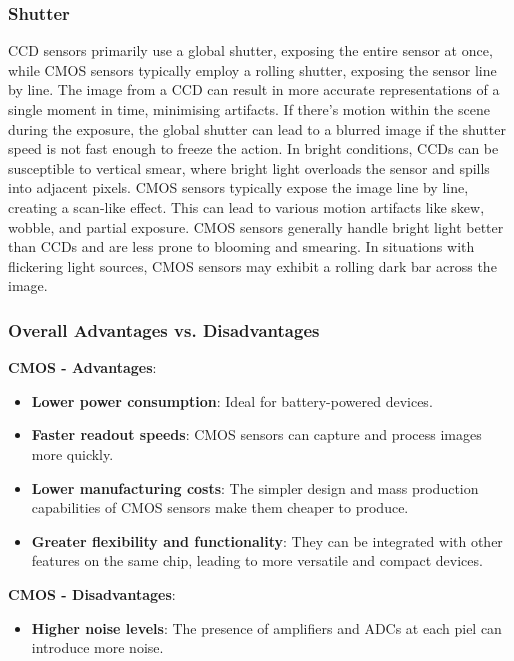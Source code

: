 \subsubsection{Shutter}
CCD sensors primarily use a global shutter, exposing the entire sensor at once, while CMOS sensors typically employ a rolling shutter, exposing the sensor line by line.
\nl
The image from a CCD can result in more accurate representations of a single moment in time, minimising artifacts. If there's motion within the scene during the exposure, the global shutter can lead to a blurred image if the shutter speed is not fast enough to freeze the action.
In bright conditions, CCDs can be susceptible to vertical smear, where bright light overloads the sensor and spills into adjacent pixels.
\nl
CMOS sensors typically expose the image line by line, creating a scan-like effect. This can lead to various motion artifacts like skew, wobble, and partial exposure.
CMOS sensors generally handle bright light better than CCDs and are less prone to blooming and smearing. In situations with flickering light sources, CMOS sensors may exhibit a rolling dark bar across the image.

\subsubsection{Overall Advantages vs. Disadvantages}
\textbf{CMOS - Advantages}:
\begin{itemize}
    \item \textbf{Lower power consumption}: Ideal for battery-powered devices.
    \item \textbf{Faster readout speeds}: CMOS sensors can capture and process images more quickly.
    \item \textbf{Lower manufacturing costs}: The simpler design and mass production capabilities of CMOS sensors make them cheaper to produce.
    \item \textbf{Greater flexibility and functionality}: They can be integrated with other features on the same chip, leading to more versatile and compact devices.
\end{itemize}
\textbf{CMOS - Disadvantages}:
\begin{itemize}
    \item \textbf{Higher noise levels}: The presence of amplifiers and ADCs at each piel can introduce more noise.
\end{itemize}

